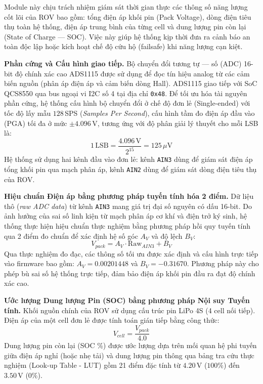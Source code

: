 \documentclass[../DoAn.tex]{subfiles}
\begin{document}
Module này chịu trách nhiệm giám sát thời gian thực các thông số năng lượng cốt lõi của ROV bao gồm: tổng điện áp khối pin (Pack Voltage), dòng điện tiêu thụ toàn hệ thống, điện áp trung bình của từng cell và dung lượng pin còn lại (State of Charge --- SOC). Việc này giúp hệ thống kịp thời đưa ra cảnh báo an toàn độc lập hoặc kích hoạt chế độ cứu hộ (failsafe) khi năng lượng cạn kiệt.

\textbf{Phần cứng và Cấu hình giao tiếp.}
Bộ chuyển đổi tương tự --- số (ADC) 16-bit độ chính xác cao ADS1115 được sử dụng để đọc tín hiệu analog từ các cảm biến nguồn (phân áp điện áp và cảm biến dòng Hall). ADS1115 giao tiếp với SoC QCS8550 qua bus ngoại vi I2C số 4 tại địa chỉ \texttt{0x48}. 
Để tối ưu hóa tài nguyên phần cứng, hệ thống cấu hình bộ chuyển đổi ở chế độ đơn lẻ (Single-ended) với tốc độ lấy mẫu $128$\,SPS (\textit{Samples Per Second}), cấu hình tầm đo điện áp đầu vào (PGA) tối đa ở mức $\pm 4.096$\,V, tương ứng với độ phân giải lý thuyết cho mỗi LSB là:
\begin{equation}
    1\,\text{LSB} = \frac{4.096\,\text{V}}{2^{15}} = 125\,\mu\text{V}
\end{equation}
Hệ thống sử dụng hai kênh đầu vào đơn lẻ: kênh \texttt{AIN3} dùng để giám sát điện áp tổng khối pin qua mạch phân áp, kênh \texttt{AIN2} dùng để giám sát dòng điện tiêu thụ của ROV.

\textbf{Hiệu chuẩn Điện áp bằng phương pháp tuyến tính hóa 2 điểm.}
Dữ liệu thô (\textit{raw ADC data}) từ kênh \texttt{AIN3} mang giá trị đại số nguyên có dấu 16-bit. Do ảnh hưởng của sai số linh kiện từ mạch phân áp cơ khí và điện trở ký sinh, hệ thống thực hiện hiệu chuẩn thực nghiệm bằng phương pháp hồi quy tuyến tính qua 2 điểm đo chuẩn để xác định hệ số góc $A_V$ và độ lệch $B_V$:
\begin{equation}
    V_{pack} = A_V \cdot \text{Raw}_{AIN3} + B_V
\end{equation}
Qua thực nghiệm đo đạc, các thông số tối ưu được xác định và cấu hình trực tiếp vào firmware bao gồm: $A_V = 0.00201448$ và $B_V = -0.31670$. Phương pháp này cho phép bù sai số hệ thống trực tiếp, đảm bảo điện áp khối pin đầu ra đạt độ chính xác cao.

\textbf{Ước lượng Dung lượng Pin (SOC) bằng phương pháp Nội suy Tuyến tính.}
Khối nguồn chính của ROV sử dụng cấu trúc pin LiPo 4S (4 cell nối tiếp). Điện áp của một cell đơn lẻ được tính toán gián tiếp bằng công thức:
\begin{equation}
    V_{cell} = \frac{V_{pack}}{4.0}
\end{equation}
Dung lượng pin còn lại (SOC \%) được ước lượng dựa trên mối quan hệ phi tuyến giữa điện áp nghỉ (hoặc nhẹ tải) và dung lượng pin thông qua bảng tra cứu thực nghiệm (Look-up Table - LUT) gồm 21 điểm đặc tính từ $4.20\,\text{V}$ ($100\%$) đến $3.50\,\text{V}$ ($0\%$). 
\end{document}
